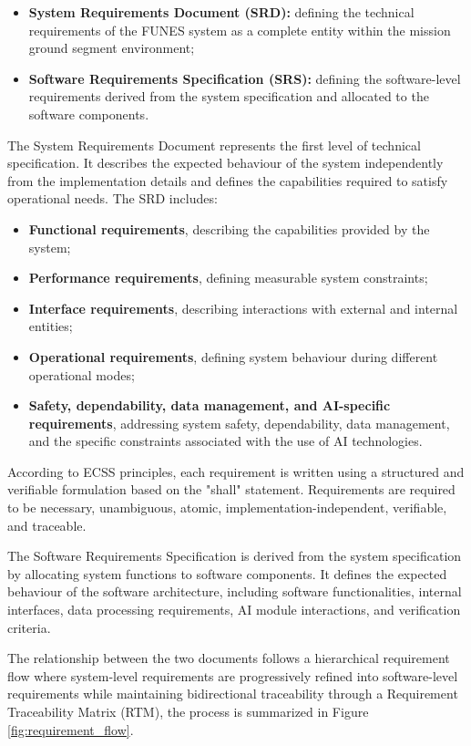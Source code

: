 \begin{itemize}
    \item \textbf{System Requirements Document (SRD):} defining the technical requirements of the FUNES system as a complete entity within the mission ground segment environment;
    
    \item \textbf{Software Requirements Specification (SRS):} defining the software-level requirements derived from the system specification and allocated to the software components.
\end{itemize}

The System Requirements Document represents the first level of technical specification. It describes the expected behaviour of the system independently from the implementation details and defines the capabilities required to satisfy operational needs.
The SRD includes:
\begin{itemize}
    \item \textbf{Functional requirements}, describing the capabilities provided by the system;
    \item \textbf{Performance requirements}, defining measurable system constraints;
    \item \textbf{Interface requirements}, describing interactions with external and internal entities;
    \item \textbf{Operational requirements}, defining system behaviour during different operational modes;
    \item \textbf{Safety, dependability, data management, and AI-specific requirements}, addressing system safety, dependability, data management, and the specific constraints associated with the use of AI technologies.
\end{itemize}

According to ECSS principles, each requirement is written using a structured and verifiable formulation based on the "shall" statement. Requirements are required to be necessary, unambiguous, atomic, implementation-independent, verifiable, and traceable.

The Software Requirements Specification is derived from the system specification by allocating system functions to software components. It defines the expected behaviour of the software architecture, including software functionalities, internal interfaces, data processing requirements, AI module interactions, and verification criteria.

The relationship between the two documents follows a hierarchical requirement flow where system-level requirements are progressively refined into software-level requirements while maintaining bidirectional traceability through a Requirement Traceability Matrix (RTM), the process is summarized in Figure \ref{fig:requirement_flow}.

